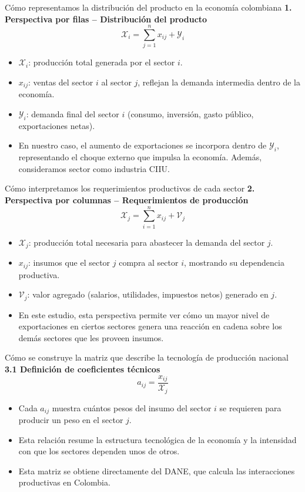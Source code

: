 \documentclass[aspectratio=169,xcolor=dvipsnames]{beamer}
\begin{document}
\begin{frame}{Cómo representamos la distribución del producto en la economía colombiana}
  \textbf{1. Perspectiva por filas – Distribución del producto}
  \[
    \mathcal{X}_i = \sum_{j=1}^{n} x_{ij} + \mathcal{Y}_i
  \]
  \begin{itemize}
    \item $\mathcal{X}_i$: producción total generada por el sector $i$.
    \item $x_{ij}$: ventas del sector $i$ al sector $j$, reflejan la demanda intermedia dentro de la economía.
    \item $\mathcal{Y}_i$: demanda final del sector $i$ (consumo, inversión, gasto público, exportaciones netas).
    \item En nuestro caso, el aumento de exportaciones se incorpora dentro de $\mathcal{Y}_i$, representando el choque externo que impulsa la economía. Además, consideramos sector como industria CIIU.
  \end{itemize}
\end{frame}

\begin{frame}{Cómo interpretamos los requerimientos productivos de cada sector}
  \textbf{2. Perspectiva por columnas – Requerimientos de producción}
  \[
    \mathcal{X}_j = \sum_{i=1}^{n} x_{ij} + \mathcal{V}_j
  \]
  \begin{itemize}
    \item $\mathcal{X}_j$: producción total necesaria para abastecer la demanda del sector $j$.
    \item $x_{ij}$: insumos que el sector $j$ compra al sector $i$, mostrando su dependencia productiva.
    \item $\mathcal{V}_j$: valor agregado (salarios, utilidades, impuestos netos) generado en $j$.
    \item En este estudio, esta perspectiva permite ver cómo un mayor nivel de exportaciones en ciertos sectores genera una reacción en cadena sobre los demás sectores que les proveen insumos.
  \end{itemize}
\end{frame}

\begin{frame}{Cómo se construye la matriz que describe la tecnología de producción nacional}
  \textbf{3.1 Definición de coeficientes técnicos}
  \[
    a_{ij} = \frac{x_{ij}}{\mathcal{X}_j}
  \]
  \begin{itemize}
    \item Cada $a_{ij}$ muestra cuántos pesos del insumo del sector $i$ se requieren para producir un peso en el sector $j$.
    \item Esta relación resume la estructura tecnológica de la economía y la intensidad con que los sectores dependen unos de otros.
    \item Esta matriz se obtiene directamente del DANE, que calcula las interacciones productivas en Colombia.
  \end{itemize}
\end{frame}
\end{document}
